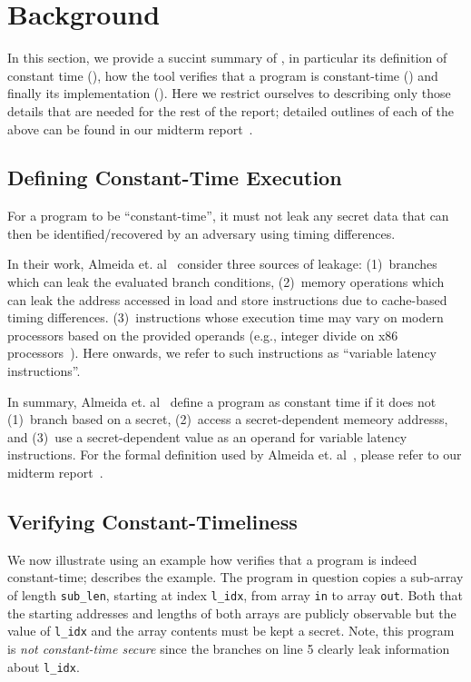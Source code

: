 \section{Background}
\label{sec:background}

In this section, we provide a succint summary of \ctVerif, in particular its definition of constant time (), how the tool verifies that a program is constant-time () and finally its implementation (). 
Here we restrict ourselves to describing only those details that are needed for the rest of the report; detailed outlines of each of the above can be found in our midterm report~\cite{midterm-report}.

\subsection{Defining Constant-Time Execution}
\label{sec:background-ct}

For a program to be ``constant-time'', it must not leak any secret data that can then be identified/recovered by an adversary using timing differences. 

In their work, Almeida et. al~\cite{almeida} consider three sources of leakage:
{(1)}~branches which can leak the evaluated branch conditions, 
{(2)}~memory operations which can leak the address accessed in load and store instructions due to cache-based timing differences.
{(3)}~instructions whose execution time may vary on modern processors based on the provided operands (e.g., integer divide on x86 processors~\cite{intel-manual}). Here onwards, we refer to such instructions as ``variable latency instructions''.

In summary, Almeida et. al~\cite{almeida} define a program as constant time if it does not 
{(1)}~branch based on a secret,
{(2)}~access a secret-dependent memeory addresss, and 
{(3)}~use a secret-dependent value as an operand for variable latency instructions.
For the formal definition used by Almeida et. al~\cite{almeida}, please refer to our midterm report~\cite{midterm-report}.


\subsection{Verifying Constant-Timeliness}
\label{sec:background-self-product}

We now illustrate using an example how \ctVerif verifies that a program is indeed constant-time;  describes the example. 
The program in question copies a sub-array of length \texttt{sub\_len}, starting at index \texttt{l\_idx}, from array \texttt{in}
to array \texttt{out}.
Both that the starting addresses and lengths of both arrays are publicly observable but the value of \texttt{l\_idx} and the array contents must be kept a secret.
Note, this program is \emph{not constant-time secure} since the branches on line 5 clearly leak information about \texttt{l\_idx}.

